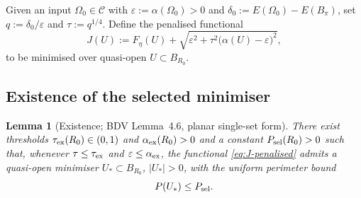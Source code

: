\documentclass[11pt]{amsart}
\newtheorem{lemma}[theorem]{Lemma}
\begin{document}
Given an input \(\Omega_0\in\mathcal C\) with
\(\varepsilon:=\alpha(\Omega_0)>0\) and
\(\delta_0:=E(\Omega_0)-E(B_\pi)\), set
\(q:=\delta_0/\varepsilon\) and \(\tau:=q^{1/4}\).  Define the penalised
functional
\begin{equation}\label{eq:J-penalised}
   J(U):=F_{\hat\eta}(U)+
      \sqrt{\varepsilon^{2}+\tau^{2}\bigl(\alpha(U)-\varepsilon\bigr)^{2}},
\end{equation}
to be minimised over quasi-open \(U\subset B_{R_0}\).

\subsection{Existence of the selected minimiser}\label{ss:existence}

\begin{lemma}[Existence; BDV Lemma~4.6, planar single-set form]
\label{lem:Ustar-exist}
There exist thresholds \(\tau_{\rm ex}(R_0)\in(0,1)\) and
\(\alpha_{\rm ex}(R_0)>0\) and a constant
\(P_{\rm sel}(R_0)>0\) such that, whenever
\(\tau\le\tau_{\rm ex}\) and \(\varepsilon\le\alpha_{\rm ex}\), the
functional \eqref{eq:J-penalised} admits a quasi-open minimiser
\(U_*\subset B_{R_0}\), \(|U_*|>0\), with the uniform perimeter bound
\begin{equation}\label{eq:P-Ustar}
   P(U_*)\le P_{\rm sel}.
\end{equation}
\end{lemma}
\end{document}
